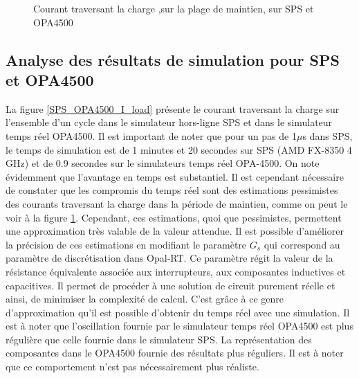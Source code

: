 \begin{figure}[htb]
\caption{Courant traversant la charge ,sur la plage de maintien, sur SPS et OPA4500}
\label{SPS_OPA4500_I_load2}
\end{figure} 

\subsection{Analyse des résultats de simulation pour SPS et OPA4500}
La figure \ref{SPS_OPA4500_I_load} présente le courant traversant la charge sur l'ensemble d'un cycle dans le simulateur hors-ligne SPS et dans le simulateur temps réel OPA4500. Il est important de noter que pour un pas de 1$\mu$s dans SPS, le temps de simulation est de 1 minutes et 20 secondes sur SPS (AMD FX-8350 4 GHz) et de 0.9 secondes sur le simulateurs temps réel OPA-4500. On note évidemment que l'avantage en temps est substantiel. Il est cependant nécessaire de constater que les compromis du temps réel sont des estimations pessimistes des courants traversant la charge dans la période de maintien, comme on peut le voir à la figure \ref{SPS_OPA4500_I_load2}. Cependant, ces estimations, quoi que pessimistes, permettent une approximation très valable de la valeur attendue. Il est possible d'améliorer la précision de ces estimations en modifiant le paramètre $G_s$ qui correspond au paramètre de discrétisation dans Opal-RT. Ce paramètre régit la valeur de la résistance équivalente associée aux interrupteurs, aux composantes inductives et capacitives. Il permet de procéder à une solution de circuit purement réelle et ainsi, de minimiser la complexité de calcul. C'est grâce à ce genre d'approximation qu'il est possible d'obtenir du temps réel avec une simulation. Il est à noter que l'oscillation fournie par le simulateur temps réel OPA4500 est plus régulière que celle fournie dans le simulateur SPS. La représentation des composantes dans le OPA4500 fournie des résultats plus réguliers. Il est à noter que ce comportement n'est pas nécessairement plus réaliste.